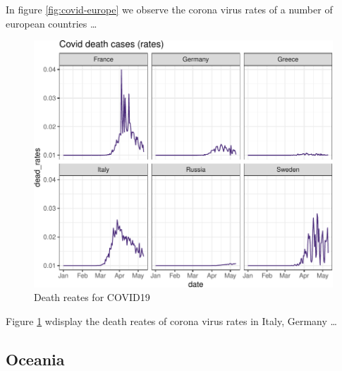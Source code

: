 \documentclass[11pt,a4paper,]{article}
\begin{document}
In figure \ref{fig:covid-europe} we observe the corona virus rates of a number of european countries \ldots{}

\begin{figure}

{\centering \includegraphics{Example_files/figure-latex/coviddeath1-1} 

}

\caption{Death reates for COVID19}\label{fig:coviddeath1}
\end{figure}

Figure \ref{fig:coviddeath1} wdisplay the death reates of corona virus rates in Italy, Germany \ldots{}

\clearpage

\hypertarget{oceania}{%
\subsection{Oceania}\label{oceania}}
\end{document}
